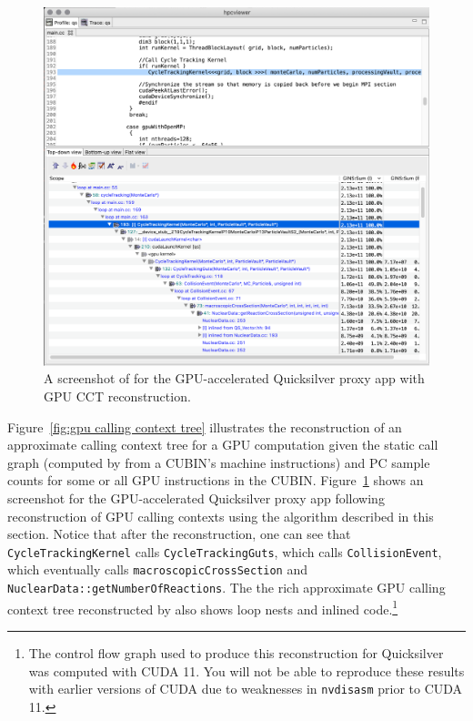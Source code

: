 \begin{figure}[t]
\centering
\includegraphics[width=\textwidth]{fig/qs-cct.svg}
\caption{A screenshot of \hpcviewer{} for the GPU-accelerated Quicksilver proxy app with GPU CCT reconstruction.}
\label{qs-cct}
\end{figure}

Figure~\ref{fig:gpu calling context tree} illustrates the reconstruction of an approximate calling context tree for a GPU computation given the static call graph (computed by \hpcstruct{} from a CUBIN's machine instructions) and PC sample counts for some or all GPU instructions in the CUBIN. Figure~\ref{qs-cct} shows an \hpcviewer{} screenshot for the GPU-accelerated Quicksilver proxy app following reconstruction of GPU calling contexts using the algorithm described in this section. Notice that after the reconstruction, one can see that \verb|CycleTrackingKernel| calls \verb|CycleTrackingGuts|, which calls \verb|CollisionEvent|, which eventually calls  \verb|macroscopicCrossSection| and \verb|NuclearData::getNumberOfReactions|. The the rich  approximate GPU calling context tree reconstructed by \hpcprof{} also shows loop nests and inlined code.\footnote{The control flow graph used to produce this reconstruction for Quicksilver was computed with CUDA 11. You will not be able to reproduce these results with earlier versions of CUDA due to weaknesses in
{\tt nvdisasm} prior to CUDA 11.}


